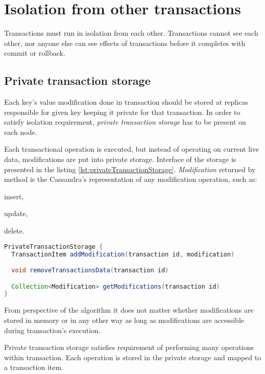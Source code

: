 
\section{Isolation from other transactions}
Transactions must run in isolation from each other. Transactions cannot see each other, nor anyone else can see effects of transactions before it completes with commit or rollback.

\subsection{Private transaction storage}
\label{sec:mpp:privateTxStorage}
Each key's value modification done in transaction should be stored at replicas responsible for given key keeping it private for that transaction. In order to satisfy isolation requirement, \emph{private transaction storage} has to be present on each node.

Each transactional operation is executed, but instead of operating on current live data, modifications are put into private storage. Interface of the storage is presented in the listing \ref{lst:privateTransactionStorage}. \emph{Modification} returned by  method is the Cassandra's representation of any modification operation, such as: \begin{enumerate*} \item insert, \item update, \item delete. \end{enumerate*}

\begin{lstlisting}[language=Java,style=outcode,label={lst:privateTransactionStorage},caption={API of private transaction storage}]
PrivateTransactionStorage {
  TransactionItem addModification(transaction id, modification)

  void removeTransactionsData(transaction id)

  Collection<Modification> getModifications(transaction id)        
}

\end{lstlisting}


From perspective of the algorithm it does not matter whether modifications are stored in memory or in any other way as long as modifications are accessible during transaction's execution.

Private transaction storage satisfies requirement of performing many operations within transaction. Each operation is stored in the private storage and mapped to a transaction item.


